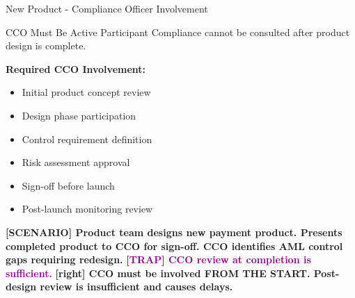 \documentclass[11pt,a4paper]{beamer}
\newcommand{\trap}[1]{\textcolor{purple}{\textbf{[TRAP] #1}}}
\newcommand{\correct}[1]{\textcolor{green!50!black}{\textbf{[right] #1}}}
\newcommand{\scenario}[1]{\textcolor{blue!70!black}{\textbf{[SCENARIO] #1}}}
\begin{document}
\begin{frame}{New Product - Compliance Officer Involvement}
\begin{block}{CCO Must Be Active Participant}
Compliance cannot be consulted after product design is complete.
\end{block}
\textbf{Required CCO Involvement:}
\begin{itemize}
\item Initial product concept review
\item Design phase participation
\item Control requirement definition
\item Risk assessment approval
\item Sign-off before launch
\item Post-launch monitoring review
\end{itemize}
\scenario{Product team designs new payment product. Presents completed product to CCO for sign-off. CCO identifies AML control gaps requiring redesign.}
\trap{CCO review at completion is sufficient.}
\correct{CCO must be involved FROM THE START. Post-design review is insufficient and causes delays.}
\end{frame}

\end{document}
